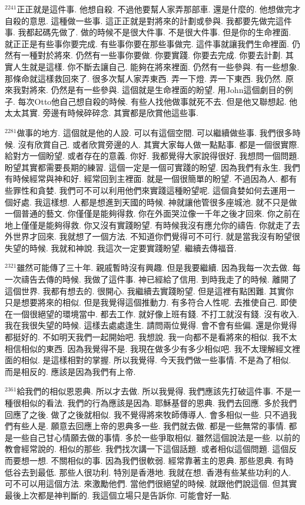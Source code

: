 \documentclass{book}
\begin{document}
$^{2241}$正正就是這件事.
他想自殺.
不過他要幫人家弄那部車.
還是什麼的.
他想做完才自殺的意思.
這種做一些事.
這正正就是對將來的計劃或參與.
我都要先做完這件事.
我都起碼先做了.
做的時候不是很大件事.
不是很大件事.
但是你的生命裡面.
就正正是有些事你要完成.
有些事你要在那些事做完.
這件事就讓我們生命裡面.
仍然有一種對於將來.
仍然有一些事你要做.
你要實踐.
你要去完成.
你要去計劃.
其實人生就是這樣.
你不斷去讓自己.
能夠在將來裡面.
仍然有一些參與.
有一些想象.
那條命就這樣救回來了.
很多次幫人家弄東西.
弄一下燈.
弄一下東西.
我仍然.
原來我對將來.
仍然是有一些參與.
這個就是生命裡面的盼望.
用John這個劇目的例子.
每次Otto他自己想自殺的時候.
有些人找他做事就死不去.
但是他又聯想起.
他太太其實.
旁邊有時候碎碎念.
其實都是欣賞他這些事.

$^{2281}$做事的地方.
這個就是他的人設.
可以有這個空間.
可以繼續做些事.
我們很多時候.
沒有欣賞自己.
或者欣賞旁邊的人.
其實大家每人做一點點事.
都是一個很實際.
給對方一個盼望.
或者存在的意義.
你好.
我都覺得大家說得很好.
我想問一個問題.
盼望其實都需要長期的練習.
這個一定是一個可實踐的盼望.
因為我們有永生.
我們有時候經常與神和好.
經常回到主裡面.
就是一個很簡單的盼望.
不過因為人.
都有些罪性和貪婪.
我們可不可以利用他們來實踐這種盼望呢.
這個貪婪如何去運用一個好處.
我這樣想.
人都是想進到天國的時候.
神就讓他管很多座城池.
就不只是做一個普通的藝文.
你僅僅是能夠得救.
你在外面哭泣像一千年之後才回來.
你之前在地上僅僅是能夠得救.
你又沒有實踐盼望.
有時候我沒有應允你的禱告.
你就走了去外世界才回來.
我就想了一個方法.
不知道你們覺得可不可行.
就是當我沒有盼望很失望的時候.
我就和神說.
我這次一定要實踐盼望.
繼續去傳福音.

$^{2321}$雖然可能傳了三十年.
親戚暫時沒有興趣.
但是我要繼續.
因為我每一次去做.
每一次禱告去傳的時候.
我做了這件事.
神已經給了信用.
到時我走了的時候.
離開了這個世界.
我都有想去的.
很開心.
我繼續去實踐盼望.
但是這裡有點困難.
其實你只是想要將來的相似.
但是我覺得這個推動力.
有多符合人性呢.
去推使自己.
即使在一個很絕望的環境當中.
都去工作.
就好像上班有錢.
不打工就沒有錢.
沒有收入.
我在我很失望的時候.
這樣去處處逢生.
請問兩位覺得.
會不會有些偏.
還是你覺得都挺好的.
不如明天我們一起開始吧.
我想說.
我一向都不是看將來的相似.
我不太相信相似的東西.
因為我覺得不是.
我現在做多少有多少相似吧.
我不太理解經文裡面的相似.
是這樣相對的掌握.
所以我覺得.
今天我們做一些事情.
不是為了相似.
而是相反的.
應該是因為我們有上帝.

$^{2361}$給我們的相似恩恩典.
所以才去做.
所以我覺得.
我們應該先打破這件事.
不是一種很相似的看法.
我們的行為應該是因為.
耶穌基督的恩典.
我們去回應.
多於我們回應了之後.
做了之後就相似.
我不覺得將來牧師傳導人.
會多相似一些.
只不過我們有些人是.
願意去回應上帝的恩典多一些.
我們就去做.
都是一些無常的事情.
都是一些自己甘心情願去做的事情.
多於一些爭取相似.
雖然這個說法是一些.
以前的教會經常說的.
相似的那些.
我們找次講一下這個話題.
或者相似這個問題.
這個反而要想一想.
不關相似的事.
因為我們很軟弱.
經常靠著主的恩典.
那些恩典.
有時低谷去到最低.
那些人很功利.
特別是香港地.
我就在想.
香港有些某些功利的人.
可不可以用這個方法.
來激勵他們.
當他們很絕望的時候.
就跟他們說這個.
但其實最後上次都是神判斷的.
我這個立場只是告訴你.
可能會好一點.
\end{document}
